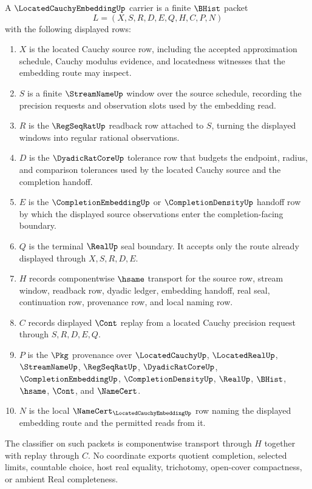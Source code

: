 \begin{definition}
\label{def:located-cauchy-embedding-carrier}
A $\LocatedCauchyEmbeddingUp$ carrier is a finite $\BHist$ packet
$$
L=(X,S,R,D,E,Q,H,C,P,N)
$$
with the following displayed rows:
\begin{enumerate}
\item $X$ is the located Cauchy source row, including the accepted approximation schedule, Cauchy modulus evidence, and locatedness witnesses that the embedding route may inspect.
\item $S$ is a finite $\StreamNameUp$ window over the source schedule, recording the precision requests and observation slots used by the embedding read.
\item $R$ is the $\RegSeqRatUp$ readback row attached to $S$, turning the displayed windows into regular rational observations.
\item $D$ is the $\DyadicRatCoreUp$ tolerance row that budgets the endpoint, radius, and comparison tolerances used by the located Cauchy source and the completion handoff.
\item $E$ is the $\CompletionEmbeddingUp$ or $\CompletionDensityUp$ handoff row by which the displayed source observations enter the completion-facing boundary.
\item $Q$ is the terminal $\RealUp$ seal boundary. It accepts only the route already displayed through $X,S,R,D,E$.
\item $H$ records componentwise $\hsame$ transport for the source row, stream window, readback row, dyadic ledger, embedding handoff, real seal, continuation row, provenance row, and local naming row.
\item $C$ records displayed $\Cont$ replay from a located Cauchy precision request through $S,R,D,E,Q$.
\item $P$ is the $\Pkg$ provenance over $\LocatedCauchyUp$, $\LocatedRealUp$, $\StreamNameUp$, $\RegSeqRatUp$, $\DyadicRatCoreUp$, $\CompletionEmbeddingUp$, $\CompletionDensityUp$, $\RealUp$, $\BHist$, $\hsame$, $\Cont$, and $\NameCert$.
\item $N$ is the local $\NameCert_{\LocatedCauchyEmbeddingUp}$ row naming the displayed embedding route and the permitted reads from it.
\end{enumerate}
The classifier on such packets is componentwise transport through $H$ together with replay through $C$. No coordinate exports quotient completion, selected limits, countable choice, host real equality, trichotomy, open-cover compactness, or ambient Real completeness.
\end{definition}

